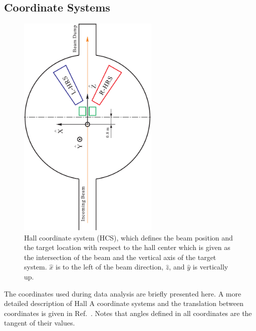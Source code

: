 \subsection{Coordinate Systems}
  \begin{figure}[!ht]
    \begin{center}
      \includegraphics[type=pdf,ext=.pdf,read=.pdf,angle=270,width=0.60\textwidth]{./figures/optics/HCS_new}
      \caption[Hall coordinate system (HCS)]{\footnotesize{Hall coordinate system (HCS), which defines the beam position and the target location with respect to the hall center which is given as the intersection of the beam and the vertical axis of the target system. $\hat{x}$ is to the left of the beam direction, $\hat{z}$, and $\hat{y}$ is vertically up.}}
      \label{HCS}
    \end{center}
  \end{figure}
 The coordinates used during data analysis are briefly presented here. A more detailed description of Hall A coordinate systems and the translation between coordinates is given in Ref.~\cite{nilanga_optics}. Notes that angles defined in all coordinates are the tangent of their values.
